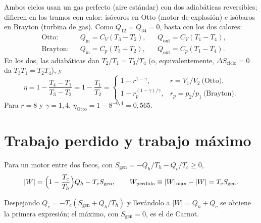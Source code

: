 Ambos ciclos usan un gas perfecto (aire estándar) con dos adiabáticas reversibles; difieren en los tramos con
calor: isócoros en Otto (motor de explosión) e isóbaros en Brayton (turbina de gas). Como $Q_{12}=Q_{34}=0$,
basta con los dos calores:
\begin{equation}\label{eq:otto}
\begin{aligned}
  &\text{Otto:} && Q_{\mathrm{in}}=C_V(T_3-T_2), && Q_{\mathrm{out}}=C_V(T_1-T_4),\\
  &\text{Brayton:} && Q_{\mathrm{in}}=C_p(T_3-T_2), && Q_{\mathrm{out}}=C_p(T_1-T_4).
\end{aligned}
\end{equation}
En los dos, las adiabáticas dan $T_2/T_1=T_3/T_4$ (o, equivalentemente, $\Delta S_{\mathrm{ciclo}}=0$ da
$T_3T_1=T_2T_4$), y
\begin{equation}\label{eq:etaotto}
  \eta=1-\frac{T_4-T_1}{T_3-T_2}=1-\frac{T_1}{T_2}
  =\begin{cases}1-r^{1-\gamma}, & r=V_1/V_2\ \text{(Otto)},\\[2pt] 1-r_p^{(1-\gamma)/\gamma}, & r_p=p_2/p_1\ \text{(Brayton)}.\end{cases}
\end{equation}
Para $r=8$ y $\gamma=1{,}4$, $\eta_{\mathrm{Otto}}=1-8^{-0,4}=0{,}565$.



\section{Trabajo perdido y trabajo máximo}

\begin{proposicion}
Para un motor entre dos focos, con $S_{\mathrm{gen}}=-Q_h/T_h-Q_c/T_c\geq0$,
\begin{equation}\label{eq:perdido}
  |W|=\Bigl(1-\frac{T_c}{T_h}\Bigr)Q_h-T_cS_{\mathrm{gen}},\qquad
  W_{\mathrm{perdido}}\equiv|W|_{\max}-|W|=T_cS_{\mathrm{gen}} .
\end{equation}
\end{proposicion}

\begin{demostracion}
Despejando $Q_c=-T_c(S_{\mathrm{gen}}+Q_h/T_h)$ y llevándolo a $|W|=Q_h+Q_c$ se obtiene la primera expresión;
el máximo, con $S_{\mathrm{gen}}=0$, es el de Carnot.
\end{demostracion}

